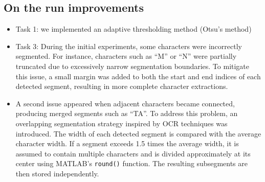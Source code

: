 \subsection{On the run improvements}
\begin{itemize}
    \item Task 1: we implemented an adaptive thresholding method (Otsu's method) 
    \item Task 3: During the initial experiments, some characters were incorrectly segmented. For instance, characters such as “M” or “N” were partially truncated due to excessively narrow segmentation boundaries. To mitigate this issue, a small margin was added to both the start and end indices of each detected segment, resulting in more complete character extractions.\\
    \item 
A second issue appeared when adjacent characters became connected, producing merged segments such as “TA”. To address this problem, an overlapping segmentation strategy inspired by OCR techniques was introduced. The width of each detected segment is compared with the average character width. If a segment exceeds 1.5 times the average width, it is assumed to contain multiple characters and is divided approximately at its center using MATLAB’s \texttt{round()} function. The resulting subsegments are then stored independently.

\end{itemize}